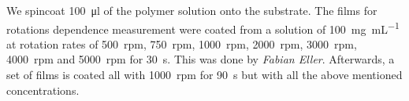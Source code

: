 
We spincoat \SI{100}{\micro\litre} of the polymer solution onto the substrate.
The films for rotations dependence measurement were coated from a solution of \SI{100}{\milli\gram\per\milli\liter} at rotation rates of
\SI{500}{rpm}, \SI{750}{rpm}, \SI{1000}{rpm}, \SI{2000}{rpm}, \SI{3000}{rpm}, \SI{4000}{rpm} and \SI{5000}{rpm} for \SI{30}{\second}. This was done by \textit{Fabian Eller}.
Afterwards, a set of films is coated all with \SI{1000}{rpm} for \SI[]{90}{\second} but with all the above mentioned concentrations.